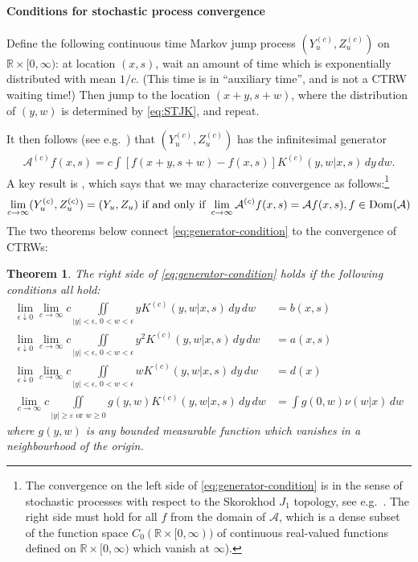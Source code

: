 \documentclass[a4paper,12pt]{elsarticle}
\numberwithin{equation}{section}
\theoremstyle{plain}
\newtheorem{theorem}{Theorem}[section]
\theoremstyle{definition}
\theoremstyle{remark}
\numberwithin{equation}{section}
\newcommand{\spc}{\mathbb R}
\newcommand{\spctim}{\spc \times [0,\infty)}
\newcommand{\1}{\mathbf 1}
\begin{document}
\paragraph{Conditions for stochastic process convergence}
Define the following continuous time Markov jump process $(Y^{(c)}_u, Z^{(c)}_u)$ on 
$\spctim$: at location $(x,s)$, wait an amount of time which is exponentially distributed with mean $1/c$. (This time is in ``auxiliary time'', and is not a CTRW waiting time!) Then jump to the location $(x+y, s+w)$, where the distribution of $(y,w)$ is determined by \eqref{eq:STJK}, and repeat. 

It then follows (see e.g.\ \cite[Proposition 17.2]{Kallenberg}) that 
$(Y^{(c)}_u, Z^{(c)}_u)$ has the infinitesimal generator
\begin{align} \label{eq:jump-process-generator}
\mathcal A^{(c)} f(x,s) = c \int [f(x+y, s+w) - f(x,s)] K^{(c)}(y,w | x,s)\,dy\,dw.
\end{align}
A key result is \cite[Theorem 17.25]{Kallenberg}, which says that we may characterize convergence as follows:\footnote{The convergence on the left side of \eqref{eq:generator-condition} is in the sense of stochastic processes with respect to the Skorokhod $J_1$ topology, see e.g.\ \cite{Whitt2010}. The right side must hold for all $f$ from the domain of $\mathcal A$, which is a dense subset of the function space $C_0(\spctim)$ of continuous real-valued functions defined on $\spctim$ which vanish at $\infty$).}
\begin{align} \label{eq:generator-condition}
\lim_{c \to \infty}(Y^{(c)}_u, Z^{(c)}_u) = (Y_u, Z_u)
\text{ if and only if }
\lim_{c \to \infty} \mathcal A^{(c)}f(x,s) = \mathcal A f(x,s), 
f \in {\rm Dom}(\mathcal A)
\end{align}
The two theorems below connect \eqref{eq:generator-condition} to the convergence of CTRWs: 

\begin{theorem} \label{theorem1}
The right side of \eqref{eq:generator-condition} holds if the following 
conditions all hold: 
\begin{align} \label{eq:cond1}
\lim_{\epsilon \downarrow 0} \lim_{c \to \infty}
c \iint\limits_{|y|< \epsilon,\,0<  w < \epsilon} y K^{(c)}(y,w | x,s)\,dy\,dw &= b(x,s)
\\ \label{eq:cond2}
\lim_{\epsilon \downarrow 0} \lim_{c \to \infty}
c \iint\limits_{|y|< \epsilon, \,0<w < \epsilon} y^2 K^{(c)}(y,w | x,s)\,dy\,dw &= a(x,s)
\\ \label{eq:cond3}
\lim_{\epsilon \downarrow 0} \lim_{c \to \infty}
c \iint\limits_{|y|< \epsilon, \,0<w < \epsilon} w K^{(c)}(y,w | x,s)\,dy\,dw &= d(x)
\\
\label{eq:cond4}
\lim_{c \to \infty}
c \iint\limits_{|y| \ge \varepsilon \text{ or } w \ge 0} g(y,w) K^{(c)} (y,w | x,s)\,dy\,dw &= \int g(0,w) \nu(w|x)\,dw
\end{align}
where $g(y,w)$ is any bounded measurable function which vanishes in a neighbourhood of the origin. 
\end{theorem}
\end{document}
